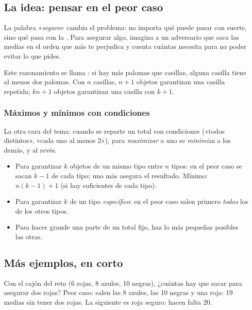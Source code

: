 \bitacora


\subsection{La idea: pensar en el peor caso}
La palabra «\emph{seguro}» cambia el problema: no importa qué puede pasar con suerte, sino qué pasa con la . Para asegurar algo, imagina a un adversario que saca las medias en el orden que más te perjudica y
cuenta cuántas necesita para no poder evitar lo que pides.

Este razonamiento se llama : si hay más palomas que casillas, alguna casilla tiene al menos
dos palomas. Con $n$ casillas, $n + 1$ objetos garantizan una casilla repetida; $kn + 1$ objetos garantizan una casilla
con $k + 1$.

\subsubsection{Máximos y mínimos con condiciones}
La otra cara del tema: cuando se reparte un total con condiciones («todos distintos», «cada uno al menos 2»), para
\emph{maximizar} a uno se \emph{minimiza} a los demás, y al revés.


\begin{regla}
\begin{itemize}
  \item Para garantizar $k$ objetos de un mismo tipo entre $n$ tipos: en el peor caso se sacan $k - 1$ de cada tipo; uno
  más asegura el resultado. Mínimo: $n(k - 1) + 1$ (si hay suficientes de cada tipo).
  \item Para garantizar $k$ de un tipo \emph{específico}: en el peor caso salen primero \emph{todos} los de los otros tipos.
  \item Para hacer grande una parte de un total fijo, haz lo más pequeñas posibles las otras.
\end{itemize}
\end{regla}

\subsection{Más ejemplos, en corto}
\begin{ejemplo}
Con el cajón del reto (6 rojas, 8 azules, 10 negras), ¿cuántas hay que sacar para asegurar dos rojas?
\solucion Peor caso: salen las 8 azules, las 10 negras y una roja: 19 medias sin tener dos rojas. La siguiente es roja
seguro: hacen falta $20$.
\end{ejemplo}

